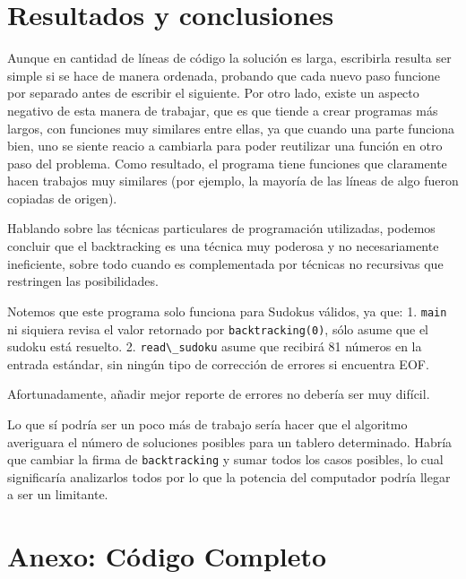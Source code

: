 \documentclass[
  spanish,
  a4paper,
,tablecaptionabove
]{scrartcl}
\newcommand{\passthrough}[1]{#1}
\begin{document}
\hypertarget{resultados-y-conclusiones}{%
\section{Resultados y conclusiones}\label{resultados-y-conclusiones}}

Aunque en cantidad de líneas de código la solución es larga, escribirla
resulta ser simple si se hace de manera ordenada, probando que cada
nuevo paso funcione por separado antes de escribir el siguiente. Por
otro lado, existe un aspecto negativo de esta manera de trabajar, que es
que tiende a crear programas más largos, con funciones muy similares
entre ellas, ya que cuando una parte funciona bien, uno se siente reacio
a cambiarla para poder reutilizar una función en otro paso del problema.
Como resultado, el programa tiene funciones que claramente hacen
trabajos muy similares (por ejemplo, la mayoría de las líneas de algo
fueron copiadas de origen).

Hablando sobre las técnicas particulares de programación utilizadas,
podemos concluir que el backtracking es una técnica muy poderosa y no
necesariamente ineficiente, sobre todo cuando es complementada por
técnicas no recursivas que restringen las posibilidades.

Notemos que este programa solo funciona para Sudokus válidos, ya que: 1.
\passthrough{\lstinline!main!} ni siquiera revisa el valor retornado por
\passthrough{\lstinline!backtracking(0)!}, sólo asume que el sudoku está
resuelto. 2. \passthrough{\lstinline!read\_sudoku!} asume que recibirá
81 números en la entrada estándar, sin ningún tipo de corrección de
errores si encuentra EOF.

Afortunadamente, añadir mejor reporte de errores no debería ser muy
difícil.

Lo que sí podría ser un poco más de trabajo sería hacer que el algoritmo
averiguara el número de soluciones posibles para un tablero determinado.
Habría que cambiar la firma de \passthrough{\lstinline!backtracking!} y
sumar todos los casos posibles, lo cual significaría analizarlos todos
por lo que la potencia del computador podría llegar a ser un limitante.

\newpage

\hypertarget{anexo-cuxf3digo}{%
\section{Anexo: Código Completo}\label{anexo-cuxf3digo}}
\end{document}
